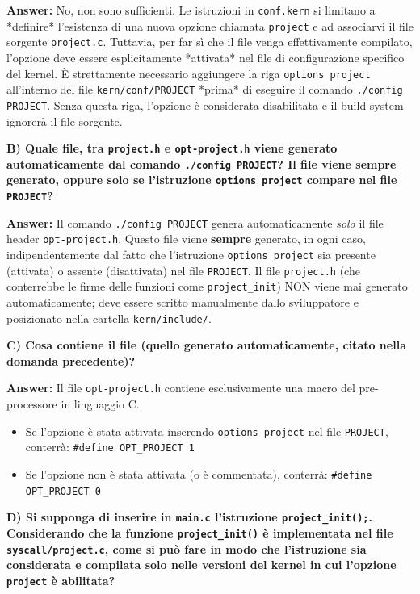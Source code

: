 \textbf{Answer:} 
No, non sono sufficienti. Le istruzioni in \texttt{conf.kern} si limitano a *definire* l'esistenza di una nuova opzione chiamata \texttt{project} e ad associarvi il file sorgente \texttt{project.c}. Tuttavia, per far sì che il file venga effettivamente compilato, l'opzione deve essere esplicitamente *attivata* nel file di configurazione specifico del kernel. È strettamente necessario aggiungere la riga \texttt{options project} all'interno del file \texttt{kern/conf/PROJECT} *prima* di eseguire il comando \texttt{./config PROJECT}. Senza questa riga, l'opzione è considerata disabilitata e il build system ignorerà il file sorgente.

\textbf{B) Quale file, tra \texttt{project.h} e \texttt{opt-project.h} viene generato automaticamente dal comando \texttt{./config PROJECT}? Il file viene sempre generato, oppure solo se l’istruzione \texttt{options project} compare nel file \texttt{PROJECT}?}

\textbf{Answer:} 
Il comando \texttt{./config PROJECT} genera automaticamente \textit{solo} il file header \texttt{opt-project.h}. Questo file viene \textbf{sempre} generato, in ogni caso, indipendentemente dal fatto che l'istruzione \texttt{options project} sia presente (attivata) o assente (disattivata) nel file \texttt{PROJECT}. Il file \texttt{project.h} (che conterrebbe le firme delle funzioni come \texttt{project\_init}) NON viene mai generato automaticamente; deve essere scritto manualmente dallo sviluppatore e posizionato nella cartella \texttt{kern/include/}.

\textbf{C) Cosa contiene il file (quello generato automaticamente, citato nella domanda precedente)?}

\textbf{Answer:} 
Il file \texttt{opt-project.h} contiene esclusivamente una macro del pre-processore in linguaggio C. 
\begin{itemize}
    \item Se l'opzione è stata attivata inserendo \texttt{options project} nel file \texttt{PROJECT}, conterrà: \texttt{\#define OPT\_PROJECT 1}
    \item Se l'opzione non è stata attivata (o è commentata), conterrà: \texttt{\#define OPT\_PROJECT 0}
\end{itemize}

\textbf{D) Si supponga di inserire in \texttt{main.c} l’istruzione \texttt{project\_init();}. Considerando che la funzione \texttt{project\_init()} è implementata nel file \texttt{syscall/project.c}, come si può fare in modo che l’istruzione sia considerata e compilata solo nelle versioni del kernel in cui l’opzione \texttt{project} è abilitata?}

